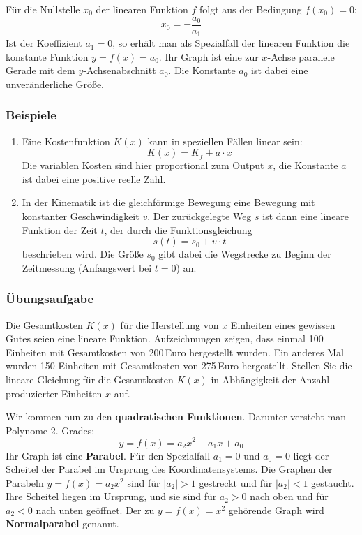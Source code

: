 Für die Nullstelle $x_0$ der linearen Funktion $f$ folgt aus der Bedingung $f(x_0) = 0$:
\[ x_0 = -\frac{a_0}{a_1} \]
Ist der Koeffizient $a_1 = 0$, so erhält man als Spezialfall der linearen Funktion die konstante Funktion $y = f(x) = a_0$. Ihr Graph ist eine zur $x$-Achse parallele Gerade mit dem $y$-Achsenabschnitt $a_0$. Die Konstante $a_0$ ist dabei eine unveränderliche Größe.

\subsubsection{Beispiele}

\begin{enumerate}[label=\alph*)]
  \item Eine Kostenfunktion $K(x)$ kann in speziellen Fällen linear sein:
    \[ K(x) = K_f + a \cdot x \]
    Die variablen Kosten sind hier proportional zum Output $x$, die Konstante $a$ ist dabei eine positive reelle Zahl.
  \item In der Kinematik ist die gleichförmige Bewegung eine Bewegung mit konstanter Geschwindigkeit $v$. Der zurückgelegte Weg $s$ ist dann eine lineare Funktion der Zeit $t$, der durch die Funktionsgleichung
    \[ s(t) = s_0 + v \cdot t \]
    beschrieben wird. Die Größe $s_0$ gibt dabei die Wegstrecke zu Beginn der Zeitmessung (Anfangswert bei $t = 0$) an.\beispielende
\end{enumerate}

\subsubsection{Übungsaufgabe}

\begin{graukasten}
  Die Gesamtkosten $K(x)$ für die Herstellung von $x$ Einheiten eines gewissen Gutes seien eine lineare Funktion. Aufzeichnungen zeigen, dass einmal 100 Einheiten mit Gesamtkosten von 200\,Euro hergestellt wurden. Ein anderes Mal wurden 150 Einheiten mit Gesamtkosten von 275\,Euro hergestellt. Stellen Sie die lineare Gleichung für die Gesamtkosten $K(x)$ in Abhängigkeit der Anzahl produzierter Einheiten $x$ auf.
\end{graukasten}

Wir kommen nun zu den \textbf{quadratischen Funktionen}. Darunter versteht man Polynome 2. Grades:
\[ y = f(x) = a_2 x^2 + a_1 x + a_0 \]
Ihr Graph ist eine \textbf{Parabel}. Für den Spezialfall $a_1 = 0$ und $a_0 = 0$ liegt der Scheitel der Parabel im Ursprung des Koordinatensystems. Die Graphen der Parabeln $y = f(x) = a_2 x^2$ sind für $|a_2| > 1$ gestreckt und für $|a_2| < 1$ gestaucht. Ihre Scheitel liegen im Ursprung, und sie sind für $a_2 > 0$ nach oben und für $a_2 < 0$ nach unten geöffnet. Der zu $y = f(x) = x^2$ gehörende Graph wird \textbf{Normalparabel} genannt.

